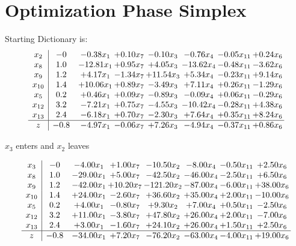 \documentclass[9pt]{article}
\begin{document}
\section{Optimization Phase Simplex}
Starting Dictionary is:
\[\begin{array}{c| c c@{\hskip 2pt} c@{\hskip 2pt} c@{\hskip 2pt} c@{\hskip 2pt} c@{\hskip 2pt} c@{\hskip 2pt} }
 x_{2}   &  -0 & -0.38 x_{1} & +  0.10 x_{7} & -0.10 x_{3} & -0.76 x_{4} & -0.05 x_{11} & +  0.24 x_{6}\\
 x_{8}   &  1.0 & -12.81 x_{1} & +  0.95 x_{7} & +  4.05 x_{3} & -13.62 x_{4} & -0.48 x_{11} & -3.62 x_{6}\\
 x_{9}   &  1.2 & +  4.17 x_{1} & -1.34 x_{7} & + 11.54 x_{3} & +  5.34 x_{4} & -0.23 x_{11} & +  9.14 x_{6}\\
 x_{10}   &  1.4 & + 10.06 x_{1} & +  0.89 x_{7} & -3.49 x_{3} & +  7.11 x_{4} & +  0.26 x_{11} & -1.29 x_{6}\\
 x_{5}   &  0.2 & +  0.46 x_{1} & +  0.09 x_{7} & -0.89 x_{3} & -0.09 x_{4} & +  0.06 x_{11} & -0.29 x_{6}\\
 x_{12}   &  3.2 & -7.21 x_{1} & +  0.75 x_{7} & -4.55 x_{3} & -10.42 x_{4} & -0.28 x_{11} & +  4.38 x_{6}\\
 x_{13}   &  2.4 & -6.18 x_{1} & +  0.70 x_{7} & -2.30 x_{3} & +  7.64 x_{4} & +  0.35 x_{11} & +  8.24 x_{6}\\
\hline
z    &  -0.8 & -4.97 x_{1} & -0.06 x_{7} & +  7.26 x_{3} & -4.94 x_{4} & -0.37 x_{11} & +  0.86 x_{6}\\
\end{array}\]


 $ x_{3} $ enters and $ x_{2} $ leaves 

 \[\begin{array}{c| c c@{\hskip 2pt} c@{\hskip 2pt} c@{\hskip 2pt} c@{\hskip 2pt} c@{\hskip 2pt} c@{\hskip 2pt} }
 x_{3}   &  -0 & -4.00 x_{1} & +  1.00 x_{7} & -10.50 x_{2} & -8.00 x_{4} & -0.50 x_{11} & +  2.50 x_{6}\\
 x_{8}   &  1.0 & -29.00 x_{1} & +  5.00 x_{7} & -42.50 x_{2} & -46.00 x_{4} & -2.50 x_{11} & +  6.50 x_{6}\\
 x_{9}   &  1.2 & -42.00 x_{1} & + 10.20 x_{7} & -121.20 x_{2} & -87.00 x_{4} & -6.00 x_{11} & + 38.00 x_{6}\\
 x_{10}   &  1.4 & + 24.00 x_{1} & -2.60 x_{7} & + 36.60 x_{2} & + 35.00 x_{4} & +  2.00 x_{11} & -10.00 x_{6}\\
 x_{5}   &  0.2 & +  4.00 x_{1} & -0.80 x_{7} & +  9.30 x_{2} & +  7.00 x_{4} & +  0.50 x_{11} & -2.50 x_{6}\\
 x_{12}   &  3.2 & + 11.00 x_{1} & -3.80 x_{7} & + 47.80 x_{2} & + 26.00 x_{4} & +  2.00 x_{11} & -7.00 x_{6}\\
 x_{13}   &  2.4 & +  3.00 x_{1} & -1.60 x_{7} & + 24.10 x_{2} & + 26.00 x_{4} & +  1.50 x_{11} & +  2.50 x_{6}\\
\hline
z    &  -0.8 & -34.00 x_{1} & +  7.20 x_{7} & -76.20 x_{2} & -63.00 x_{4} & -4.00 x_{11} & + 19.00 x_{6}\\
\end{array}\]
\end{document}
